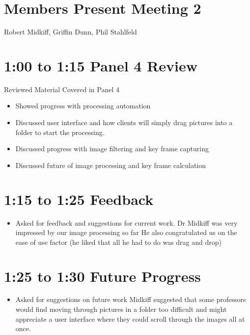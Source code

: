 \documentclass[]{article}
\begin{document}
	\section*{Members Present Meeting 2}
		Robert Midkiff, Griffin Dunn, Phil Stahlfeld
	\section*{1:00 to 1:15 Panel 4 Review}
		\noindent Reviewed Material Covered in Panel 4
		\begin{itemize}
				\item Showed progress with processing automation
				\item Discussed user interface and how clients will simply drag pictures into a folder to start the processing.
				\item Discussed progress with image filtering and key frame capturing
				\item Discussed future of image processing and key frame calculation
		\end{itemize}
	\section*{1:15 to 1:25 Feedback}
		\begin{itemize}
			\item Asked for feedback and suggestions for current work.
				\subitem Dr Midkiff was very impressed by our image processing so far
				\subitem He also congratulated us on the ease of use factor (he liked that all he had to do was drag and drop)	
		\end{itemize}
	\section*{1:25 to 1:30 Future Progress}
		\begin{itemize}
			\item Asked for suggestions on future work
				\subitem Midkiff suggested that some professors would find moving through pictures in a folder too difficult and might appreciate a user interface where they could scroll through the images all at once.
		\end{itemize}	
\end{document}
